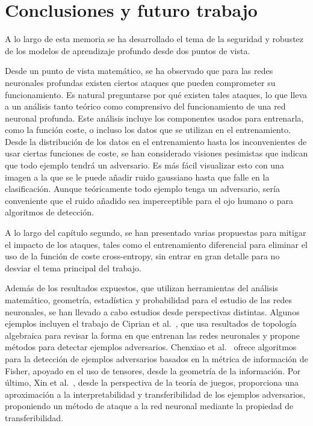 
\chapter{Conclusiones y futuro trabajo}
\label{cap:capitulo5}

A lo largo de esta memoria se ha desarrollado el tema de la seguridad y robustez de los modelos de aprendizaje profundo desde dos puntos de vista.

Desde un punto de vista matemático, se ha observado que para las redes neuronales profundas existen ciertos ataques que pueden comprometer su funcionamiento. Es natural preguntarse por qué existen tales ataques, lo que lleva a un análisis tanto teórico como comprensivo del funcionamiento de una red neuronal profunda. Este análisis incluye los componentes usados para entrenarla, como la función coste, o incluso los datos que se utilizan en el entrenamiento. Desde la distribución de los datos en el entrenamiento hasta los inconvenientes de usar ciertas funciones de coste, se han considerado visiones pesimistas que indican que todo ejemplo tendrá un adversario. Es más fácil visualizar esto con una imagen a la que se le puede añadir ruido gaussiano hasta que falle en la clasificación. Aunque teóricamente todo ejemplo tenga un adversario, sería conveniente que el ruido añadido sea imperceptible para el ojo humano o para algoritmos de detección.

A lo largo del capítulo segundo, se han presentado varias propuestas para mitigar el impacto de los ataques, tales como el entrenamiento diferencial para eliminar el uso de la función de coste cross-entropy, sin entrar en gran detalle para no desviar el tema principal del trabajo.

Además de los resultados expuestos, que utilizan herramientas del análisis matemático, geometría, estadística y probabilidad para el estudio de las redes neuronales, se han llevado a cabo estudios desde perspectivas distintas. Algunos ejemplos incluyen el trabajo de Ciprian et al.~\cite{TopoAlg}, que usa resultados de topología algebraica para revisar la forma en que entrenan las redes neuronales y propone métodos para detectar ejemplos adversarios. Chenxiao et al.~\cite{HiddenNeur} ofrece algoritmos para la detección de ejemplos adversarios basados en la métrica de información de Fisher, apoyado en el uso de tensores, desde la geometría de la información. Por último, Xin et al.~\cite{TeoJuegos}, desde la perspectiva de la teoría de juegos, proporciona una aproximación a la interpretabilidad y transferibilidad de los ejemplos adversarios, proponiendo un método de ataque a la red neuronal mediante la propiedad de transferibilidad.


